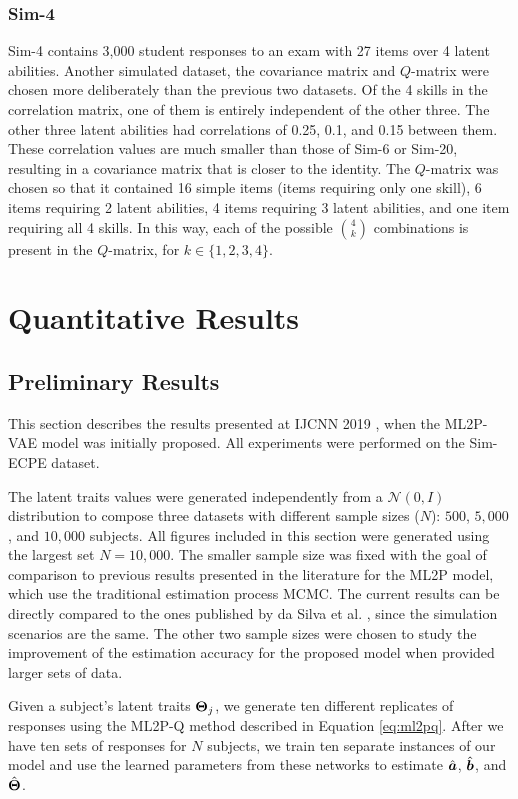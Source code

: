\subsubsection*{Sim-4} Sim-4 contains 3,000 student responses to an exam with 27 items over 4 latent abilities. Another simulated dataset, the covariance matrix and $Q$-matrix were chosen more deliberately than the previous two datasets. Of the 4 skills in the correlation matrix, one of them is entirely independent of the other three. The other three latent abilities had correlations of 0.25, 0.1, and 0.15 between them. These correlation values are much smaller than those of Sim-6 or Sim-20, resulting in a covariance matrix that is closer to the identity. The $Q$-matrix was chosen so that it contained 16 simple items (items requiring only one skill), 6 items requiring 2 latent abilities, 4 items requiring 3 latent abilities, and one item requiring all 4 skills. In this way, each of the possible $\binom{4}{k}$ combinations is present in the $Q$-matrix, for $k\in \{1,2,3,4\}$.

\section{Quantitative Results}

\subsection{Preliminary Results}\label{sec:prelim}
This section describes the results presented at IJCNN 2019 \cite{ijcnn_paper}, when the ML2P-VAE model was initially proposed. All experiments were performed on the Sim-ECPE dataset.

The latent traits values were generated independently from a $\mathcal{N}(0,I)$ distribution to compose three datasets with different sample sizes ($N$): $500$, $5,000$, and $10,000$ subjects. All figures included in this section were generated using the largest set $N=10,000$. The smaller sample size was fixed with the goal of comparison to previous results presented in the literature for the ML2P model, which use the traditional estimation process MCMC. The current results can be directly compared to the ones published by da Silva et al. \cite{daSilva2018}, since the simulation scenarios are the same. The other two sample sizes were chosen to study the improvement of the estimation accuracy for the proposed model when provided larger sets of data.

Given a subject's latent traits $\boldsymbol{\Theta}_j$, we generate ten different replicates of responses using the ML2P-Q method \cite{daSilva2018} described in Equation \ref{eq:ml2pq}. After we have ten sets of responses for $N$ subjects, we train ten separate instances of our model and use the learned parameters from these networks to estimate $\hat{\boldsymbol{a}}$, $\hat{\boldsymbol{b}}$, and $\hat{\boldsymbol{\Theta}}$.

